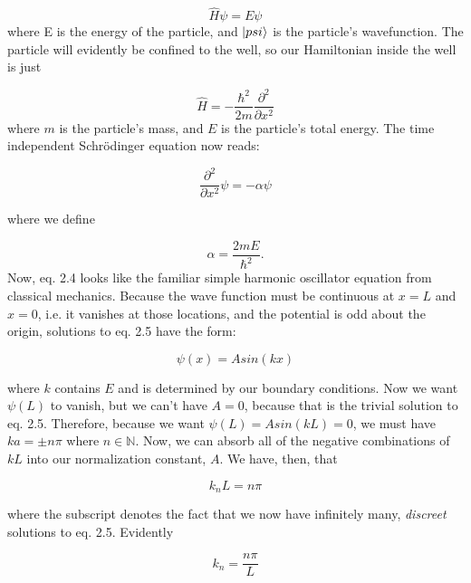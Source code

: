 \begin{equation}
\hat{H} \psi = E\psi
\end{equation}
where E is the energy of the particle, and $\ket{psi}$ is the particle's wavefunction. The particle will evidently be confined to the well, so our Hamiltonian inside the well is just

\begin{equation}
\hat{H} = - \frac{\hbar^2}{2m} \frac{\partial^2}{\partial x^2}
\label{hamil}
\end{equation}
where $m$ is the particle's mass, and $E$ is the particle's total energy. The time independent Schr\"{o}dinger equation now reads:

\begin{equation} \label{tise}
\frac{\partial^2}{\partial x^2} \psi = - \alpha \psi
\end{equation}

where we define 

\begin{equation}
\alpha = \frac{2mE}{\hbar^2}.
\end{equation}
Now, eq. 2.4 looks like the familiar simple harmonic oscillator equation from classical mechanics. Because the wave function must be continuous at $x = L$ and $ x = 0$, i.e. it vanishes at those locations, and the potential is odd about the origin,  solutions to eq. 2.5 have the form:

\begin{equation} \label{soln1}
\psi(x) = A sin(k x) 
\end{equation}

where $k$ contains $E$ and is determined by our boundary conditions. Now we want $\psi(L)$ to vanish, but we can't have $A =0$, because that is the trivial solution to eq. 2.5. Therefore, because we want $\psi(L) = Asin(k L) = 0 $, we must have $ka = \pm n \pi$ where $n \in \mathbb{N}$. Now, we can absorb all of the negative combinations of $k L$ into our normalization constant, $A$. We have, then, that 

\begin{equation}
k_n L = n \pi 
\end{equation}

where the subscript denotes the fact that we now have infinitely many, \textit{discreet} solutions to eq. 2.5. Evidently 

\begin{equation}
k_n = \frac{ n \pi}{L}
\end{equation}

